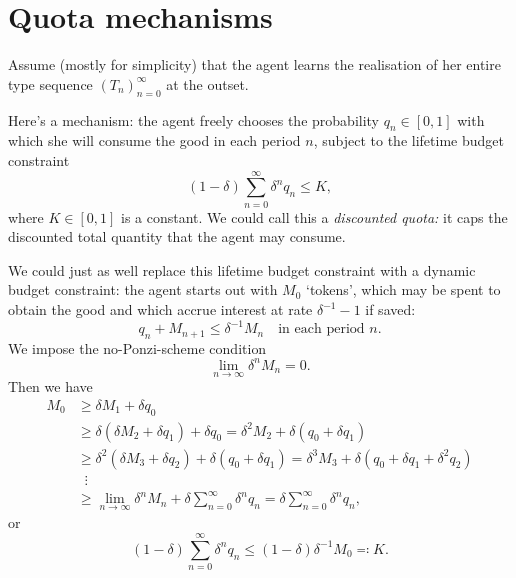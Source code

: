 \section{Quota mechanisms}
\label{sec:ch3:token}

Assume (mostly for simplicity) that the agent learns the realisation of her entire type sequence $(T_n)_{n=0}^\infty$ at the outset.

Here's a mechanism:
the agent freely chooses
the probability $q_n \in [0,1]$ with which she will consume the good in each period $n$,
subject to the lifetime budget constraint
%
\begin{equation*}
	(1-\delta) \sum_{n=0}^\infty \delta^n q_n 
	\leq K ,
\end{equation*}
%
where $K \in [0,1]$ is a constant.
We could call this a \emph{discounted quota:}
it caps the discounted total quantity that the agent may consume.

We could just as well replace this lifetime budget constraint with a dynamic budget constraint: the agent starts out with $M_0$ `tokens',
which may be spent to obtain the good and which accrue interest at rate $\delta^{-1}-1$ if saved:
%
\begin{equation*}
	q_n + M_{n+1}
	\leq \delta^{-1} M_n 
	\quad \text{in each period $n$.}
\end{equation*}
%
We impose the no-Ponzi-scheme condition
%
\begin{equation*}
	\lim_{n \to \infty} \delta^n M_n = 0 .
\end{equation*}
%
Then we have
%
\begin{align*}
	M_0
	&\geq \delta M_1 + \delta q_0
	\\
	&\geq \delta ( \delta M_2 + \delta q_1 )
	+ \delta q_0
	= \delta^2 M_2
	+ \delta ( q_0 + \delta q_1 )
	\\
	&\geq \delta^2 ( \delta M_3 + \delta q_2 )
	+ \delta ( q_0 + \delta q_1 )
	= \delta^3 M_3
	+ \delta \left( q_0 + \delta q_1 + \delta^2 q_2 \right)
	\\
	&\;\; \vdots
	\\
	&\geq \lim_{n \to \infty} \delta^n M_n
	+ \delta \sum_{n=0}^\infty \delta^n q_n 
	= \delta \sum_{n=0}^\infty \delta^n q_n ,
\end{align*}
%
or
%
\begin{equation*}
	(1-\delta) \sum_{n=0}^\infty \delta^n q_n
	\leq (1-\delta) \delta^{-1} M_0
	\eqqcolon K.
\end{equation*}

